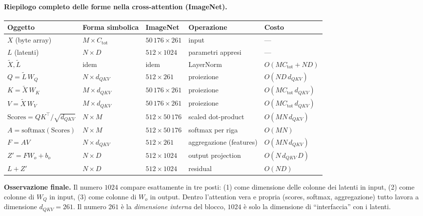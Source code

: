 \documentclass[
  11pt,
]{article}
\begin{document}
\paragraph{Riepilogo completo delle forme nella cross-attention (ImageNet).}

\begin{center}
{\small
\begin{tabular}{@{}lllll@{}}
\toprule
\textbf{Oggetto} & \textbf{Forma simbolica} & \textbf{ImageNet} & \textbf{Operazione} & \textbf{Costo} \\
\midrule
$X$ (byte array) & $M \times C_{\text{tot}}$ & $50\,176 \times 261$ & input & --- \\
$L$ (latenti) & $N \times D$ & $512 \times 1024$ & parametri appresi & --- \\
$\tilde{X}, \tilde{L}$ & idem & idem & LayerNorm & $O(MC_{\text{tot}} + ND)$ \\
$Q = \tilde{L}\,W_Q$ & $N \times d_{QKV}$ & $512 \times 261$ & proiezione & $O(ND\,d_{QKV})$ \\
$K = \tilde{X}\,W_K$ & $M \times d_{QKV}$ & $50\,176 \times 261$ & proiezione & $O(MC_{\text{tot}}\,d_{QKV})$ \\
$V = \tilde{X}\,W_V$ & $M \times d_{QKV}$ & $50\,176 \times 261$ & proiezione & $O(MC_{\text{tot}}\,d_{QKV})$ \\
$\text{Scores} = QK^\top/\sqrt{d_{QKV}}$ & $N \times M$ & $512 \times 50\,176$ & scaled dot-product & $O(MN\,d_{QKV})$ \\
$A = \text{softmax}(\text{Scores})$ & $N \times M$ & $512 \times 50\,176$ & softmax per riga & $O(MN)$ \\
$F = AV$ & $N \times d_{QKV}$ & $512 \times 261$ & aggregazione (features) & $O(MN\,d_{QKV})$ \\
$Z' = FW_o + b_o$ & $N \times D$ & $512 \times 1024$ & output projection & $O(N\,d_{QKV}\,D)$ \\
$L + Z'$ & $N \times D$ & $512 \times 1024$ & residual & $O(ND)$ \\
\bottomrule
\end{tabular}
}
\end{center}

\textbf{Osservazione finale.} Il numero $1024$ compare esattamente in tre posti: (1) come dimensione delle colonne dei latenti in input, (2) come colonne di $W_Q$ in input, (3) come colonne di $W_o$ in output. Dentro l'attention vera e propria (scores, softmax, aggregazione) tutto lavora a dimensione $d_{QKV} = 261$. Il numero $261$ è la \emph{dimensione interna} del blocco, $1024$ è solo la dimensione di ``interfaccia'' con i latenti.
\end{document}
